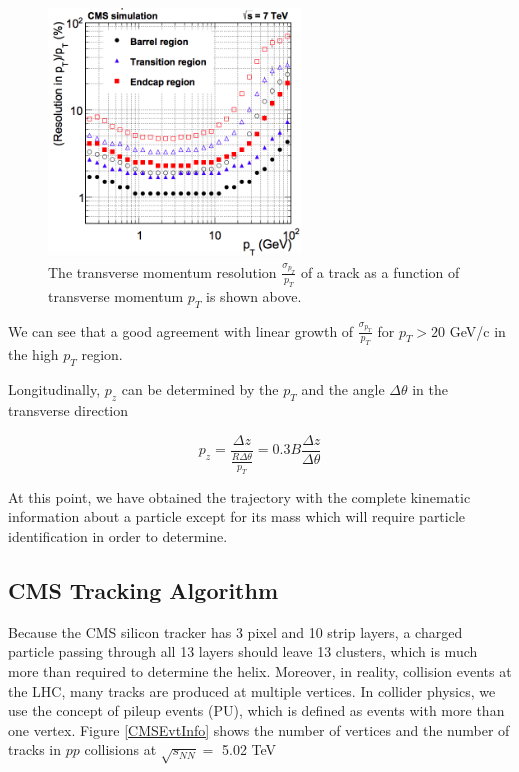 \begin{figure}[hbtp]
\begin{center}
\includegraphics[width=0.60\textwidth]{Figures/Chapter4/CMSpTReso.png}
\caption{The transverse momentum resolution $\frac{\sigma_{p_T}}{p_T}$ of a track as a function of transverse momentum $p_T$ is shown above.}
\label{CMSpTReso}
\end{center}
\end{figure} 

We can see that a good agreement with linear growth of $\frac{\sigma_{p_T}}{p_T}$ for $p_T > 20$ GeV/c in the high $p_T$ region.

Longitudinally, $p_z$ can be determined by the $p_T$ and the angle $\Delta \theta$ in the transverse direction 

\begin{equation}
p_z = \frac{\Delta z}{\frac{R\Delta \theta}{p_T}} = 0.3B \frac{\Delta z}{\Delta \theta}
\end{equation}

At this point, we have obtained the trajectory with the complete kinematic information about a particle except for its mass which will require particle identification in order to determine.

\subsection{CMS Tracking Algorithm}


Because the CMS silicon tracker has 3 pixel and 10 strip layers, a charged particle passing through all 13 layers should leave 13 clusters, which is much more than required to determine the helix. Moreover, in reality, collision events at the LHC, many tracks are produced at multiple vertices. In collider physics, we use the concept of pileup events (PU), which is defined as events with more than one vertex. Figure \ref{CMSEvtInfo} shows the number of vertices and the number of tracks in $pp$ collisions at $\sqrt{s_{NN}} = $ 5.02 TeV

